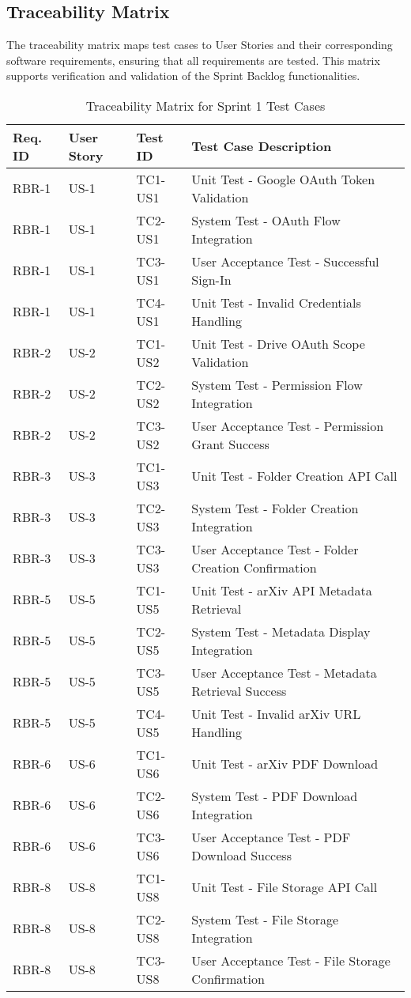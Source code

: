 \documentclass[12pt]{article}
\begin{document}
\subsection{Traceability Matrix}
The traceability matrix maps test cases to User Stories and their corresponding software requirements, ensuring that all requirements are tested. This matrix supports verification and validation of the Sprint Backlog functionalities.

\begin{table}[htbp]
  \centering
  \caption{Traceability Matrix for Sprint 1 Test Cases}
  \label{tab:traceabilityMatrix}
  \begin{tabular}{|l|l|l|l|}
    \hline
    \textbf{Req. ID} & \textbf{User Story} & \textbf{Test ID} & \textbf{Test Case Description} \\
    \hline
    RBR-1 & US-1 & TC1-US1 & Unit Test - Google OAuth Token Validation \\
    RBR-1 & US-1 & TC2-US1 & System Test - OAuth Flow Integration \\
    RBR-1 & US-1 & TC3-US1 & User Acceptance Test - Successful Sign-In \\
    RBR-1 & US-1 & TC4-US1 & Unit Test - Invalid Credentials Handling \\
    \hline
    RBR-2 & US-2 & TC1-US2 & Unit Test - Drive OAuth Scope Validation \\
    RBR-2 & US-2 & TC2-US2 & System Test - Permission Flow Integration \\
    RBR-2 & US-2 & TC3-US2 & User Acceptance Test - Permission Grant Success \\
    \hline
    RBR-3 & US-3 & TC1-US3 & Unit Test - Folder Creation API Call \\
    RBR-3 & US-3 & TC2-US3 & System Test - Folder Creation Integration \\
    RBR-3 & US-3 & TC3-US3 & User Acceptance Test - Folder Creation Confirmation \\
    \hline
    RBR-5 & US-5 & TC1-US5 & Unit Test - arXiv API Metadata Retrieval \\
    RBR-5 & US-5 & TC2-US5 & System Test - Metadata Display Integration \\
    RBR-5 & US-5 & TC3-US5 & User Acceptance Test - Metadata Retrieval Success \\
    RBR-5 & US-5 & TC4-US5 & Unit Test - Invalid arXiv URL Handling \\
    \hline
    RBR-6 & US-6 & TC1-US6 & Unit Test - arXiv PDF Download \\
    RBR-6 & US-6 & TC2-US6 & System Test - PDF Download Integration \\
    RBR-6 & US-6 & TC3-US6 & User Acceptance Test - PDF Download Success \\
    \hline
    RBR-8 & US-8 & TC1-US8 & Unit Test - File Storage API Call \\
    RBR-8 & US-8 & TC2-US8 & System Test - File Storage Integration \\
    RBR-8 & US-8 & TC3-US8 & User Acceptance Test - File Storage Confirmation \\
    \hline
  \end{tabular}
\end{table}
\end{document}
